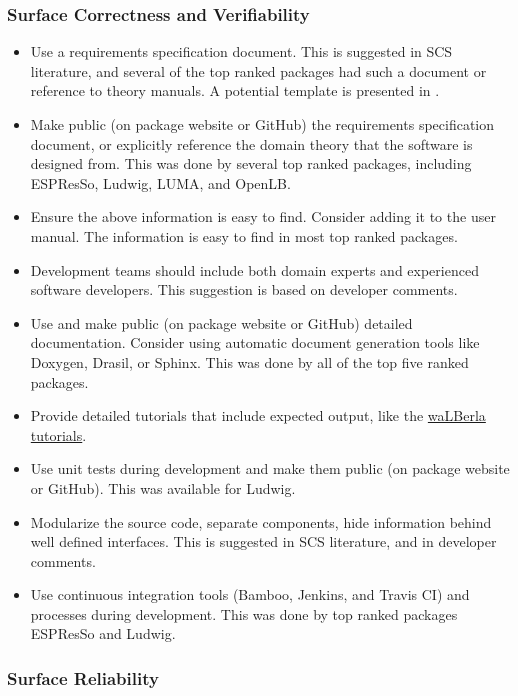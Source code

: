 \documentclass[final, 3p, times, authoryear]{elsarticle}
\begin{document}
\subsubsection{Surface Correctness and Verifiability}

\begin{itemize}
	\item Use a requirements specification document. This is suggested in SCS
	literature, and several of the top ranked packages had such a document or
	reference to theory manuals. A potential template is presented in
	\citep{smith2005new}. 
	\item Make public (on package website or GitHub) the requirements
	specification document, or explicitly reference the domain theory that the
	software is designed from.  This was done by several top ranked packages,
	including ESPResSo, Ludwig, LUMA, and OpenLB.
	\item Ensure the above information is easy to find. Consider adding it to the user manual. The information is easy to find in most top ranked packages.
	\item Development teams should include both domain experts and experienced software developers. This suggestion is based on developer comments.
	\item Use and make public (on package website or GitHub) detailed documentation. Consider using automatic document generation tools like Doxygen, Drasil, or Sphinx. This was done by all of the top five ranked packages.
	\item Provide detailed tutorials that include expected output, like the \href{https://www.walberla.net/doxygen/index.html}{waLBerla tutorials}.
	\item Use unit tests during development and make them public (on package website or GitHub). This was available for Ludwig.
	\item Modularize the source code, separate components, hide information  behind well defined interfaces. This is suggested in SCS literature, and in developer comments.
	\item Use continuous integration tools (Bamboo, Jenkins, and Travis CI) and processes during development. This was done by top ranked packages ESPResSo and Ludwig.
\end{itemize}

\subsubsection{Surface Reliability}
\end{document}
